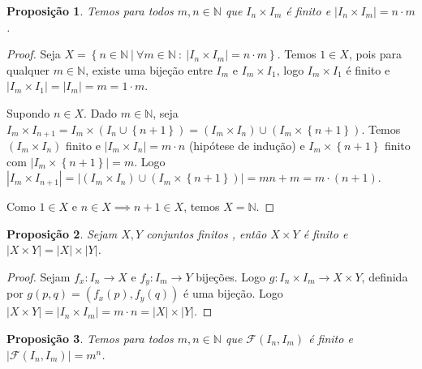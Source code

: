 \documentclass{article}
\theoremstyle{plain}
\newtheorem{prop}{Proposição}[section]
\theoremstyle{definition}
\theoremstyle{remark}
\begin{document}
\begin{prop}
	Temos para todos $m,n\in \mathbb{N}$ que $I_n\times I_m$ é finito e $|I_n\times I_m| = n\cdot m$.
\end{prop}
\begin{proof}
	Seja $X = \left\{ n \in \mathbb{N} \: | \: \forall m\in \mathbb{N} \: : \: |I_n \times I_m| = n\cdot m \right\}$.  Temos $1\in X$, pois para qualquer $m\in \mathbb{N}$, existe uma bijeção entre $I_m$ e $I_m\times I_1$, logo $I_m\times I_1$ é finito e  $|I_m\times I_1| = |I_m| = m = 1\cdot m$.


	Supondo $n \in X$. Dado $m\in \mathbb{N}$, seja $ I_m \times I_{n+1} = I_m\times \left( I_n \cup \left\{n+1\right\} \right) = (I_m \times I_n) \cup \left( I_m \times \left\{ n+1\right\}\right)$. Temos $(I_m \times I_n)$ finito e $|I_m \times I_n| = m\cdot n$ (hipótese de indução) e $I_m\times \left\{n+1\right\}$ finito com  $|I_m\times \left\{n+1\right\}| = m$. Logo $| I_m \times I_{n+1}  |=| (I_m \times I_n) \cup \left( I_m \times \left\{ n+1\right\}\right)| = mn + m = m\cdot(n+1)$.

	Como $1\in X$ e $n\in X \implies n+1\in X$, temos $X = \mathbb{N}$.
\end{proof}
\begin{prop}
	Sejam $X,Y$ conjuntos finitos , então $X\times  Y$ é finito e $|X\times Y| = |X| \times |Y|$.
\end{prop}
\begin{proof}
	Sejam $f_x : I_n \to X$ e $f_y : I_m \to Y$ bijeções. Logo $g: I_n \times I_m \to X\times Y$, definida por $g(p,q) = (f_x(p), f_y(q))$ é uma bijeção. Logo $|X\times Y| = |I_n\times I_m| = m\cdot n = |X| \times |Y|$.
		
\end{proof}
\begin{prop}
	Temos para todos $m,n\in \mathbb{N}$ que $\mathcal{F}(I_n, I_m)$ é finito e $|\mathcal{F}(I_n, I_m)| = m^n$.
\end{prop}
\end{document}
